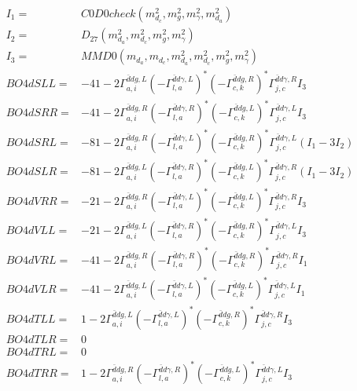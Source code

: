 \documentclass[A4,landscape]{article}
\begin{document}
\begin{align} 
I_1 = & C0D0check(m^2_{d_{{c}}}, m^2_{g}, m^2_{\gamma}, m^2_{d_{{a}}}) \\ 
I_2 = & D_{27}(m^2_{d_{{a}}}, m^2_{d_{{c}}}, m^2_{g}, m^2_{\gamma}) \\ 
I_3 = & MMD0(m_{d_{{a}}}, m_{d_{{c}}}, m^2_{d_{{a}}}, m^2_{d_{{c}}}, m^2_{g}, m^2_{\gamma}) \\ 
  BO4dSLL= & -4 1
-
2 \Gamma^{\bar{d}d g ,L}_{a, i} (- \Gamma^{\bar{d}d \gamma ,L} _{l, a})^* (- \Gamma^{\bar{d}d g ,R} _{c, k})^* \Gamma^{\bar{d}d \gamma ,R}_{j, c} I_3 \\ 
  BO4dSRR= & -4 1
-
2 \Gamma^{\bar{d}d g ,R}_{a, i} (- \Gamma^{\bar{d}d \gamma ,R} _{l, a})^* (- \Gamma^{\bar{d}d g ,L} _{c, k})^* \Gamma^{\bar{d}d \gamma ,L}_{j, c} I_3 \\ 
  BO4dSRL= & -8 1
-
2 \Gamma^{\bar{d}d g ,R}_{a, i} (- \Gamma^{\bar{d}d \gamma ,L} _{l, a})^* (- \Gamma^{\bar{d}d g ,R} _{c, k})^* \Gamma^{\bar{d}d \gamma ,L}_{j, c} (I_1 - 3 I_2) \\ 
  BO4dSLR= & -8 1
-
2 \Gamma^{\bar{d}d g ,L}_{a, i} (- \Gamma^{\bar{d}d \gamma ,R} _{l, a})^* (- \Gamma^{\bar{d}d g ,L} _{c, k})^* \Gamma^{\bar{d}d \gamma ,R}_{j, c} (I_1 - 3 I_2) \\ 
  BO4dVRR= & -2 1
-
2 \Gamma^{\bar{d}d g ,R}_{a, i} (- \Gamma^{\bar{d}d \gamma ,L} _{l, a})^* (- \Gamma^{\bar{d}d g ,L} _{c, k})^* \Gamma^{\bar{d}d \gamma ,R}_{j, c} I_3 \\ 
  BO4dVLL= & -2 1
-
2 \Gamma^{\bar{d}d g ,L}_{a, i} (- \Gamma^{\bar{d}d \gamma ,R} _{l, a})^* (- \Gamma^{\bar{d}d g ,R} _{c, k})^* \Gamma^{\bar{d}d \gamma ,L}_{j, c} I_3 \\ 
  BO4dVRL= & -4 1
-
2 \Gamma^{\bar{d}d g ,R}_{a, i} (- \Gamma^{\bar{d}d \gamma ,R} _{l, a})^* (- \Gamma^{\bar{d}d g ,R} _{c, k})^* \Gamma^{\bar{d}d \gamma ,R}_{j, c} I_1 \\ 
  BO4dVLR= & -4 1
-
2 \Gamma^{\bar{d}d g ,L}_{a, i} (- \Gamma^{\bar{d}d \gamma ,L} _{l, a})^* (- \Gamma^{\bar{d}d g ,L} _{c, k})^* \Gamma^{\bar{d}d \gamma ,L}_{j, c} I_1 \\ 
  BO4dTLL= & 1
-
2 \Gamma^{\bar{d}d g ,L}_{a, i} (- \Gamma^{\bar{d}d \gamma ,L} _{l, a})^* (- \Gamma^{\bar{d}d g ,R} _{c, k})^* \Gamma^{\bar{d}d \gamma ,R}_{j, c} I_3 \\ 
  BO4dTLR= & 0 \\ 
  BO4dTRL= & 0 \\ 
  BO4dTRR= & 1
-
2 \Gamma^{\bar{d}d g ,R}_{a, i} (- \Gamma^{\bar{d}d \gamma ,R} _{l, a})^* (- \Gamma^{\bar{d}d g ,L} _{c, k})^* \Gamma^{\bar{d}d \gamma ,L}_{j, c} I_3 \\ 
\end{align} 
\end{document}
